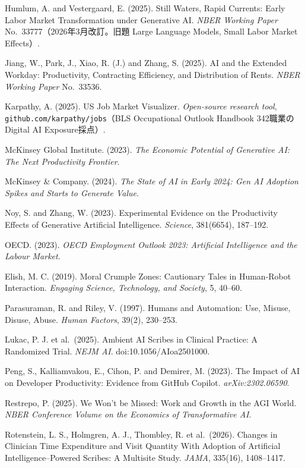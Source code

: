 \documentclass[11pt]{article}
\theoremstyle{plain}
\theoremstyle{definition}
\theoremstyle{remark}
\begin{document}
\begin{list}{}{\setlength{\leftmargin}{1.4em}\setlength{\itemindent}{-1.4em}\setlength{\itemsep}{2pt}}
\item Humlum, A. and Vestergaard, E. (2025). Still Waters, Rapid Currents: Early Labor Market Transformation under Generative AI. \textit{NBER Working Paper} No.\ 33777（2026年3月改訂。旧題 Large Language Models, Small Labor Market Effects）.
\item Jiang, W., Park, J., Xiao, R. (J.) and Zhang, S. (2025). AI and the Extended Workday: Productivity, Contracting Efficiency, and Distribution of Rents. \textit{NBER Working Paper} No.\ 33536.
\item Karpathy, A. (2025). US Job Market Visualizer. \textit{Open-source research tool}, \texttt{github.com/karpathy/jobs}（BLS Occupational Outlook Handbook 342職業のDigital AI Exposure採点）.
\item McKinsey Global Institute. (2023). \textit{The Economic Potential of Generative AI: The Next Productivity Frontier}.
\item McKinsey \& Company. (2024). \textit{The State of AI in Early 2024: Gen AI Adoption Spikes and Starts to Generate Value}.
\item Noy, S. and Zhang, W. (2023). Experimental Evidence on the Productivity Effects of Generative Artificial Intelligence. \textit{Science}, 381(6654), 187--192.
\item OECD. (2023). \textit{OECD Employment Outlook 2023: Artificial Intelligence and the Labour Market}.
\item Elish, M. C. (2019). Moral Crumple Zones: Cautionary Tales in Human-Robot Interaction. \textit{Engaging Science, Technology, and Society}, 5, 40--60.
\item Parasuraman, R. and Riley, V. (1997). Humans and Automation: Use, Misuse, Disuse, Abuse. \textit{Human Factors}, 39(2), 230--253.
\item Lukac, P. J. et al.\ (2025). Ambient AI Scribes in Clinical Practice: A Randomized Trial. \textit{NEJM AI}. doi:10.1056/AIoa2501000.
\item Peng, S., Kalliamvakou, E., Cihon, P. and Demirer, M. (2023). The Impact of AI on Developer Productivity: Evidence from GitHub Copilot. \textit{arXiv:2302.06590}.
\item Restrepo, P. (2025). We Won't be Missed: Work and Growth in the AGI World. \textit{NBER Conference Volume on the Economics of Transformative AI}.
\item Rotenstein, L. S., Holmgren, A. J., Thombley, R. et al.\ (2026). Changes in Clinician Time Expenditure and Visit Quantity With Adoption of Artificial Intelligence--Powered Scribes: A Multisite Study. \textit{JAMA}, 335(16), 1408--1417.

\end{list}
\end{document}
